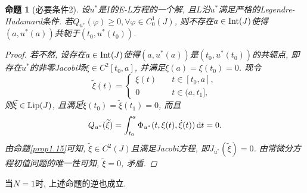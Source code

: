 \documentclass[12pt,a4paper]{article}
\newtheorem{proposition}[theorem]{命题}
\begin{document}
\begin{proposition}[必要条件2]
    设$u^*$是$I$的E-L方程的一个解, 且$L$沿$u^*$满足严格的Legendre-Hadamard条件.
    若$Q_{u^*}(\varphi) \geq 0, \forall \varphi \in C_0^1(J)$, 则不存在$a \in {\rm Int}(J)$使得$(a, u^*(a))$共轭于$(t_0, u^*(t_0))$.
    \begin{proof}
        若不然, 设存在$a \in {\rm Int}(J)$使得$(a, u^*(a))$是$(t_0, u^*(t_0))$的共轭点, 即存在$u^*$的非零Jacobi场$\xi \in C^2[t_0, a]$, 并满足$\xi(a) = \xi(t_0) = 0$.
        现令 
        \begin{equation*}
            \widetilde{\xi}(t) =  
            \begin{cases} 
                \xi(t) \quad &t \in  [t_0, a], \\  
                0 \quad &t \in (a, t_1], 
            \end{cases} 
        \end{equation*}
        则$\widetilde{\xi} \in {\rm Lip}(J)$, 且满足$\widetilde{\xi}(t_0) = \widetilde{\xi}(t_1) = 0$, 而且 
        \begin{equation*}
            Q_{u^*}(\widetilde{\xi}) = \int_{t_0}^a\Phi_{u^*}(t, \xi(t), \dot\xi(t)) \,{\rm d}t = 0.
        \end{equation*}
        由命题\ref{prop1.15}可知, $\widetilde{\xi} \in C^2(J)$且满足Jacobi方程, 即$J_{u^*}(\widetilde{\xi}) = 0$.
        由常微分方程初值问题的唯一性可知, $\widetilde{\xi} = 0$, 矛盾.
    \end{proof}  
\end{proposition}

当$N = 1$时, 上述命题的逆也成立.
\end{document}

